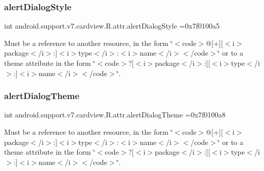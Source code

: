 \subsubsection{\texorpdfstring{alert\+Dialog\+Style}{alertDialogStyle}}
{\footnotesize\ttfamily int android.\+support.\+v7.\+cardview.\+R.\+attr.\+alert\+Dialog\+Style =0x7f0100a5\hspace{0.3cm}{\ttfamily [static]}}

Must be a reference to another resource, in the form \char`\"{}$<$code$>$@\mbox{[}+\mbox{]}\mbox{[}$<$i$>$package$<$/i$>$\+:\mbox{]}$<$i$>$type$<$/i$>$\+:$<$i$>$name$<$/i$>$$<$/code$>$\char`\"{} or to a theme attribute in the form \char`\"{}$<$code$>$?\mbox{[}$<$i$>$package$<$/i$>$\+:\mbox{]}\mbox{[}$<$i$>$type$<$/i$>$\+:\mbox{]}$<$i$>$name$<$/i$>$$<$/code$>$\char`\"{}. \mbox{\label{classandroid_1_1support_1_1v7_1_1cardview_1_1R_1_1attr_a9c69f1c157431fd550f9dea2ab773ad5}} 
\subsubsection{\texorpdfstring{alert\+Dialog\+Theme}{alertDialogTheme}}
{\footnotesize\ttfamily int android.\+support.\+v7.\+cardview.\+R.\+attr.\+alert\+Dialog\+Theme =0x7f0100a8\hspace{0.3cm}{\ttfamily [static]}}

Must be a reference to another resource, in the form \char`\"{}$<$code$>$@\mbox{[}+\mbox{]}\mbox{[}$<$i$>$package$<$/i$>$\+:\mbox{]}$<$i$>$type$<$/i$>$\+:$<$i$>$name$<$/i$>$$<$/code$>$\char`\"{} or to a theme attribute in the form \char`\"{}$<$code$>$?\mbox{[}$<$i$>$package$<$/i$>$\+:\mbox{]}\mbox{[}$<$i$>$type$<$/i$>$\+:\mbox{]}$<$i$>$name$<$/i$>$$<$/code$>$\char`\"{}. \mbox{\label{classandroid_1_1support_1_1v7_1_1cardview_1_1R_1_1attr_a94a46df52b8cc0f96c6d082ef05258c3}} 
